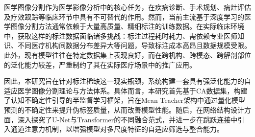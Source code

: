 医学图像分割作为医学影像分析中的核心任务，在疾病诊断、手术规划、病灶评估及疗效跟踪等临床环节中具有不可替代的作用。然而，当前主流基于深度学习的医学图像分割方法通常依赖于大量高质量、精细标注的训练数据。在实际临床环境中，获取这样的标注数据面临诸多挑战：标注过程耗时耗力、需依赖专业医师知识、不同医疗机构间数据分布差异大等问题，导致标注成本高昂且数据规模受限。此外，现有模型往往在特定数据集上表现良好，而在跨机构、跨模态、跨解剖部位的泛化能力较差，严重制约了其在实际医疗场景中的推广应用。

因此，本研究旨在针对标注稀缺这一现实瓶颈，系统构建一套具有强泛化能力的自适应医学图像分割理论与方法体系。具体而言，本研究首先基于CA数据集，构建了认知不确定性引导的半监督学习框架，旨在Mean Teacher架构中通过量化模型预测的不确定性来提升伪标签质量，从而改善模型性能。随后，在网络结构设计方面，深入探究了U-Net与Transformer的不同融合范式，并进一步在跳跃连接中引入通道注意力机制，以增强模型对多尺度特征的自适应筛选与整合能力。